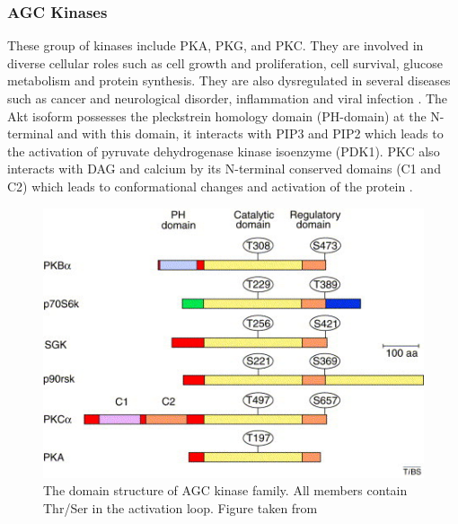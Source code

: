 \documentclass[a4paper, 11pt]{report}
\begin{document}
\subsubsection{AGC Kinases}
These group of kinases include PKA, PKG, and PKC. They are involved in diverse cellular roles such as cell growth and proliferation, cell survival, glucose metabolism and protein synthesis. They are also dysregulated in several diseases such as cancer and neurological disorder, inflammation and viral infection \cite {rakshambikai2015typical}. The Akt isoform possesses the pleckstrein homology domain (PH-domain) at the N-terminal and with this domain, it interacts with PIP3 and PIP2  which leads to the activation of pyruvate dehydrogenase kinase isoenzyme (PDK1). PKC also interacts with DAG and calcium by its N-terminal conserved domains (C1 and C2) which leads to conformational changes and activation of the protein \cite{duong2013human}.\\
\begin{figure}[H]
	\includegraphics[width=.7\linewidth]{figures/agc_kinase.jpg}
	\centering
	\caption{The domain structure of AGC kinase family. All members contain Thr/Ser in the activation loop. Figure taken from \cite{brazil2001ten} }
	\label{agc_kinase}
\end{figure}
\end{document}
